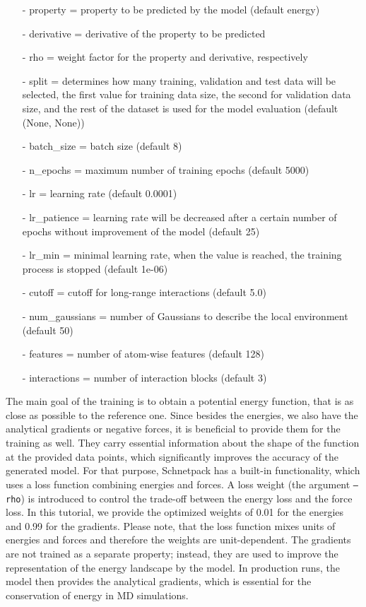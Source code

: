 \begin{enumerate}
    \item[-] property = property to be predicted by the model (default energy)
    \item[-] derivative = derivative of the property to be predicted
    \item[-] rho = weight factor for the property and derivative, respectively
    \item[-] split = determines how many training, validation and test data will be selected, the first value for training data size, the second for validation data size, and the rest of the dataset is used for the model evaluation (default (None, None))
    \item[-] batch\_size = batch size (default 8)
    \item[-] n\_epochs = maximum number of training epochs (default 5000)
    \item[-] lr = learning rate (default 0.0001)
    \item[-] lr\_patience = learning rate will be decreased after a certain number of epochs without improvement of the model (default 25)
    \item[-] lr\_min = minimal learning rate, when the value is reached, the training process is stopped (default 1e-06)
    \item[-] cutoff = cutoff for long-range interactions (default 5.0)
    \item[-] num\_gaussians = number of Gaussians to describe the local environment (default 50)
    \item[-] features = number of atom-wise features (default 128)
    \item[-] interactions = number of interaction blocks (default 3)
\end{enumerate}


The main goal of the training is to obtain a potential energy function, that is as close as possible to the reference one. Since besides the energies, we also have the analytical gradients or negative forces, it is beneficial to provide them for the training as well. They carry essential information about the shape of the function at the provided data points, which significantly improves the accuracy of the generated model. For that purpose, Schnetpack has a built-in functionality, which uses a loss function combining energies and forces. A loss weight (the argument \texttt{--rho}) is introduced to control the trade-off between the energy loss and the force loss. In this tutorial, we provide the optimized weights of 0.01 for the energies and 0.99 for the gradients. Please note, that the loss function mixes units of energies and forces and therefore the weights are unit-dependent. The gradients are not trained as a separate property; instead, they are used to improve the representation of the energy landscape by the model. In production runs, the model then provides the analytical gradients, which is essential for the conservation of energy in MD simulations.

